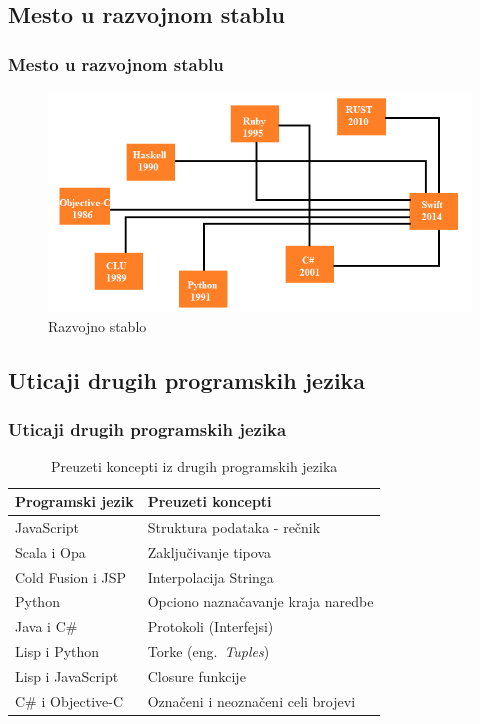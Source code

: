 \documentclass{beamer}
\begin{document}
\subsection{Mesto u razvojnom stablu}
\begin{frame}
\frametitle{ Mesto u razvojnom stablu}

\begin{figure}[h!]
\begin{center}
\includegraphics[scale=0.5]{razvojno_stablo.png}
\end{center}
\caption{Razvojno stablo}
\label{fig:razvojno_stablo}
\end{figure}
\end{frame}

\subsection{Uticaji drugih programskih jezika}
\begin{frame}
\frametitle{Uticaji drugih programskih jezika}

\begin{table}[h!]
\begin{center}
\caption{Preuzeti koncepti iz drugih programskih jezika}
\begin{tabular}{|l|l|} \hline
\label{tab:koncepti}
\textbf{Programski jezik} & \textbf{Preuzeti koncepti} \\ \hline
JavaScript & Struktura podataka - rečnik  \\ \hline
Scala i Opa & Zaključivanje tipova \\ \hline
Cold Fusion i JSP & Interpolacija Stringa \\ \hline
Python & Opciono naznačavanje kraja naredbe \\ \hline
Java i C\# & Protokoli (Interfejsi) \\ \hline
Lisp i Python & Torke (eng.~{\em Tuples}) \\ \hline
Lisp i JavaScript &  Closure funkcije \\ \hline
C\# i Objective-C & Označeni i neoznačeni celi brojevi \\ \hline
\end{tabular}
\end{center}
\end{table}
\end{frame}
\end{document}
